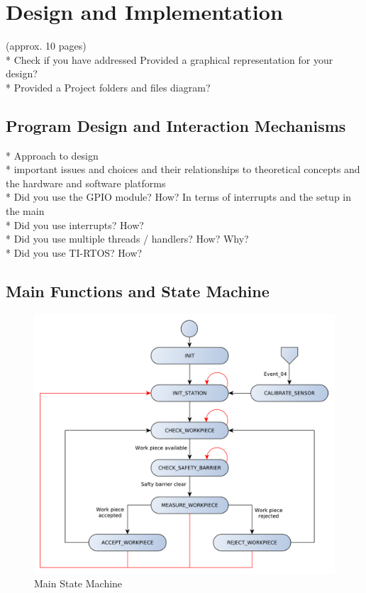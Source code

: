 \chapter{Design and Implementation}

(approx. 10 pages)\\

* Check if you have addressed Provided a graphical representation for your design?\\
* Provided a Project folders and files diagram?\\


\section{Program Design and Interaction Mechanisms} %
* Approach to design\\
* important issues and choices and their relationships to theoretical concepts and the hardware and software platforms\\
* Did you use the GPIO module? How? In terms of interrupts and the setup in the main\\
* Did you use interrupts? How?\\ 
* Did you use multiple threads / handlers? How? Why?\\
* Did you use TI-RTOS? How?\\

\section{Main Functions and State Machine} %

\begin{figure}[H]
	\begin{center}
		\includegraphics[scale=.60]{media/StateMachine_Main.pdf} 	
		\caption{Main State Machine}
		\label{fig:statemachine}
	\end{center}
\end{figure}

